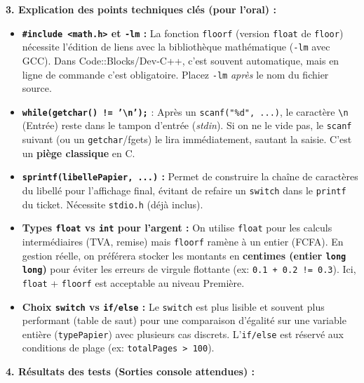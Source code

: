 \documentclass[11pt]{article}
\begin{document}
\begin{exoresolu}
\medskip
\noindent\textbf{3. Explication des points techniques clés (pour l'oral) :}

\begin{itemize}
    \item \textbf{\texttt{\#include <math.h>} et \texttt{-lm} :} La fonction \texttt{floorf} (version \texttt{float} de \texttt{floor}) nécessite l'édition de liens avec la bibliothèque mathématique (\texttt{-lm} avec GCC). Dans Code::Blocks/Dev-C++, c'est souvent automatique, mais en ligne de commande c'est obligatoire. Placez \texttt{-lm} \emph{après} le nom du fichier source.
    \item \textbf{\texttt{while(getchar() != '\textbackslash n');}} : Après un \texttt{scanf("\%d", ...)}, le caractère \texttt{\textbackslash n} (Entrée) reste dans le tampon d'entrée (\textit{stdin}). Si on ne le vide pas, le \texttt{scanf} suivant (ou un \texttt{getchar}/fgets) le lira immédiatement, sautant la saisie. C'est un \textbf{piège classique} en C.
    \item \textbf{\texttt{sprintf(libellePapier, ...)} :} Permet de construire la chaîne de caractères du libellé pour l'affichage final, évitant de refaire un \texttt{switch} dans le \texttt{printf} du ticket. Nécessite \texttt{stdio.h} (déjà inclus).
    \item \textbf{Types \texttt{float} vs \texttt{int} pour l'argent :} On utilise \texttt{float} pour les calculs intermédiaires (TVA, remise) mais \texttt{floorf} ramène à un entier (FCFA). En gestion réelle, on préférera stocker les montants en \textbf{centimes (entier \texttt{long long})} pour éviter les erreurs de virgule flottante (ex: \texttt{0.1 + 0.2 != 0.3}). Ici, \texttt{float} + \texttt{floorf} est acceptable au niveau Première.
    \item \textbf{Choix \texttt{switch} vs \texttt{if/else} :} Le \texttt{switch} est plus lisible et souvent plus performant (table de saut) pour une comparaison d'égalité sur une variable entière (\texttt{typePapier}) avec plusieurs cas discrets. L'\texttt{if/else} est réservé aux conditions de plage (ex: \texttt{totalPages > 100}).
\end{itemize}

\medskip
\noindent\textbf{4. Résultats des tests (Sorties console attendues) :}


\end{exoresolu}
\end{document}
